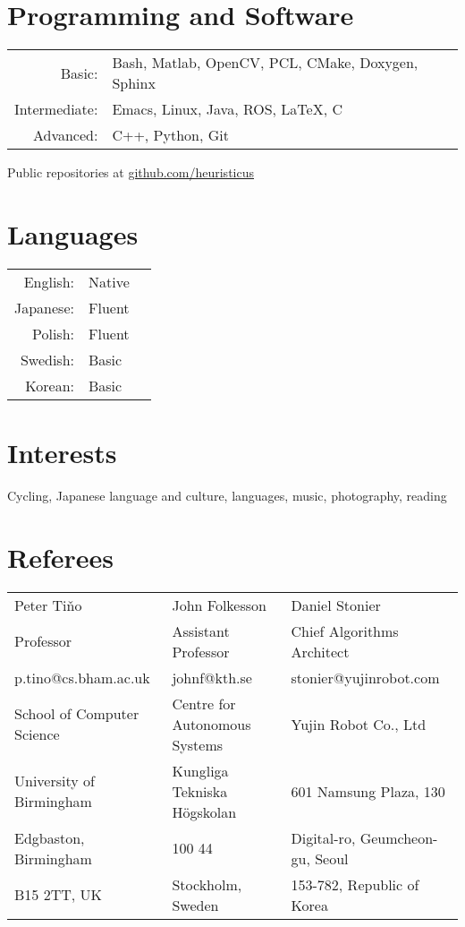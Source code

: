 \documentclass[a4paper,10pt]{article}
\begin{document}
\begin{minipage}[t]{0.47\textwidth}
  \section{Programming and Software}
  \begin{tabular}{rp{}}
    Basic:& Bash, Matlab, OpenCV, PCL, CMake, Doxygen, Sphinx\\
    Intermediate:& Emacs, Linux, Java, ROS, \LaTeX, C\\
    Advanced:& C++, Python, Git
  \end{tabular}
  \vskip 0.2cm
  \centering
  Public repositories at \href{http://www.github.com/heuristicus}{github.com/heuristicus}
\end{minipage}
\textwidth
\begin{minipage}[t]{0.47\textwidth}
  \section{Languages}
  \begin{tabular}{rlr}%
    English:&Native\\
    Japanese:&Fluent\\
    Polish:&Fluent\\
    Swedish:&Basic\\
    Korean:&Basic
  \end{tabular}
\end{minipage}

\section{Interests}
Cycling, Japanese language and culture, languages, music, photography, reading

\section{Referees}
\begin{center}
  \begin{tabular}{lll}
  Peter Ti{\v{n}}o& John Folkesson & Daniel Stonier \\
  Professor  & Assistant Professor & Chief Algorithms Architect\\
  p.tino@cs.bham.ac.uk & johnf@kth.se & stonier@yujinrobot.com\\
  School of Computer Science& Centre for Autonomous Systems & Yujin Robot Co., Ltd  \rule{0pt}{0.6cm} \\
  University of Birmingham& Kungliga Tekniska H\"{o}gskolan & 601 Namsung Plaza, 130  \\
  Edgbaston, Birmingham & 100 44 & Digital-ro, Geumcheon-gu, Seoul \\
  B15 2TT, UK& Stockholm, Sweden & 153-782, Republic of Korea
\end{tabular}
\end{center}
\end{document}
